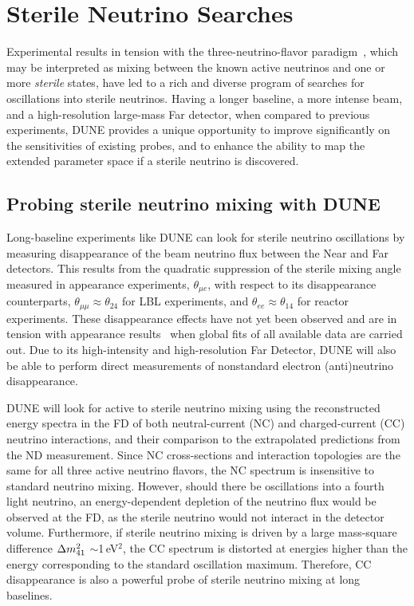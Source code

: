 \section{Sterile Neutrino Searches}
Experimental results in tension with the three-neutrino-flavor paradigm~\cite{LSNDSterile,MiniBooNESterile,GalliumSummary,ReactorSummary}, which may be interpreted as mixing between the known active neutrinos and one or more {\it sterile} states, have led to a rich and diverse program of searches for oscillations into sterile neutrinos. Having a longer baseline, a more intense beam, and a high-resolution large-mass Far detector, when compared to previous experiments, DUNE provides a unique opportunity to improve significantly on the sensitivities of existing probes, and to enhance the ability to map the extended parameter space if a sterile neutrino is discovered.
	\subsection{Probing sterile neutrino mixing with DUNE}
    Long-baseline experiments like DUNE can look for sterile neutrino oscillations by measuring disappearance of the beam neutrino flux between the Near and Far detectors. This results from the quadratic suppression of the sterile mixing angle measured in appearance experiments, $\theta_{\mu e}$, with respect to its disappearance counterparts, $\theta_{\mu\mu}\approx\theta_{24}$ for LBL experiments, and $\theta_{ee}\approx\theta_{14}$ for reactor experiments. These disappearance effects have not yet been observed and are in tension with appearance results~\cite{ref:tension} when global fits of all available data are carried out. Due to its high-intensity and high-resolution Far Detector, DUNE will also be able to perform direct measurements of nonstandard electron (anti)neutrino disappearance. 

DUNE will look for active to sterile neutrino mixing using the reconstructed energy spectra in the FD of both neutral-current (NC) and charged-current (CC) neutrino interactions, and their comparison to the extrapolated predictions from the ND measurement. Since NC cross-sections and interaction topologies are the same for all three active neutrino flavors, the NC spectrum is insensitive to standard neutrino mixing. However, should there be oscillations into a fourth light neutrino, an energy-dependent depletion of the neutrino flux would be observed at the FD, as the sterile neutrino would not interact in the detector volume. Furthermore, if sterile neutrino mixing is driven by a large mass-square difference $\Delta m^2_{\rm{41}}$ $\sim$1\,eV$^{2}$, the CC spectrum is distorted at energies higher than the energy corresponding to the standard oscillation maximum. Therefore, CC disappearance is also a powerful probe of sterile neutrino mixing at long baselines. 

